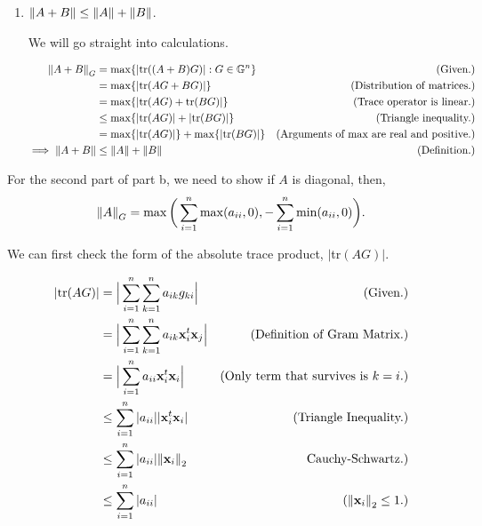 \begin{solution}
\begin{enumerate}[(1)]
            \item $\norm{A + B} \leq \norm{A} + \norm{B}$.

            \jump
            We will go straight into calculations.

            \alignbreak
            \begin{align}
                \norm{A+B}_G &= \max \{ |\text{tr}((A+B)G)| : G \in \mathbb{G}^n \} &\text{(Given.)}\nonumber\\
                &= \max \{ |\text{tr}(AG + BG)|\} &\text{(Distribution of matrices.)}\nonumber\\
                &= \max \{ |\text{tr}(AG) + \text{tr}(BG)|\} &\text{(Trace operator is linear.)}\nonumber\\
                &\leq \max \{ |\text{tr}(AG)| + |\text{tr}(BG)|\} &\text{(Triangle inequality.)}\nonumber\\
                &= \max \{ |\text{tr}(AG)|\} + \max \{|\text{tr}(BG)|\} &\text{(Arguments of max are real and positive.)}\nonumber\\
                \implies \norm{A + B} &\leq \norm{A} + \norm{B} &\text{(Definition.)}\nonumber
            \end{align}
           \alignbreak
    \end{enumerate}

    \jump
    For the second part of part b, we need to show if $A$ is diagonal, then,
\[
\norm{A}_G = \max\bigg( \sum_{i = 1}^n \max (a_{ii}, 0), -\sum_{i = 1}^n \min (a_{ii}, 0)\bigg).
\]


We can first check the form of the absolute trace product, $|$tr$(AG)|$.
    
    \alignbreak
    \begin{align}
        |\text{tr}(AG)| &= \Big| \sum_{i = 1}^n\sum_{k = 1}^na_{ik}g_{ki} \Big| &\text{(Given.)}\nonumber\\
        &= \Big| \sum_{i = 1}^n\sum_{k = 1}^na_{ik}\textbf{x}^t_i\textbf{x}_j \Big| &\text{(Definition of Gram Matrix.)}\nonumber\\
        &= \Big| \sum_{i = 1}^na_{ii}\textbf{x}^t_i\textbf{x}_i \Big| &\text{(Only term that survives is $k = i$.)}\nonumber\\
        &\leq \sum_{i = 1}^n|a_{ii}||\textbf{x}^t_i\textbf{x}_i| &\text{(Triangle Inequality.)}\nonumber\\
        &\leq \sum_{i = 1}^n|a_{ii}| \norm{\textbf{x}_i}_2 &\text{Cauchy-Schwartz.)}\nonumber\\
        &\leq \sum_{i = 1}^n|a_{ii}| &(\norm{\textbf{x}_i}_2 \leq 1.)\label{p1b: trag}
    \end{align}
    \alignbreak


\end{solution}
